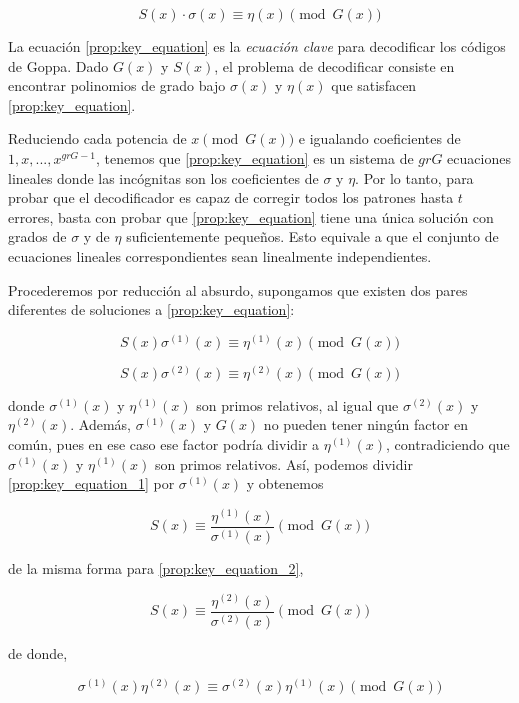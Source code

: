 \begin{equation}
    \label{prop:key_equation}
    S(x) \cdot \sigma(x) \equiv \eta(x) \pmod{G(x)}
\end{equation}

La ecuación \ref{prop:key_equation} es la \emph{ecuación clave} para decodificar los códigos de Goppa. Dado $G(x)$ y $S(x)$, el problema de decodificar consiste en encontrar polinomios de grado bajo $\sigma(x)$ y $\eta(x)$ que satisfacen \ref{prop:key_equation}.

Reduciendo cada potencia de $x \pmod{G(x)}$ e igualando coeficientes de $1, x, ..., x^{gr G - 1}$, tenemos que \ref{prop:key_equation} es un sistema de $gr G$ ecuaciones lineales donde las incógnitas son los coeficientes de $\sigma$ y $\eta$. Por lo tanto, para probar que el decodificador es capaz de corregir todos los patrones hasta $t$ errores, basta con probar que \ref{prop:key_equation} tiene una única solución con grados de $\sigma$ y de $\eta$ suficientemente pequeños. Esto equivale a que el conjunto de ecuaciones lineales correspondientes sean linealmente independientes.

Procederemos por reducción al absurdo, supongamos que existen dos pares diferentes de soluciones a \ref{prop:key_equation}:

\begin{equation}
    \label{prop:key_equation_1}
    S(x) \sigma^{(1)}(x) \equiv \eta^{(1)}(x) \pmod{G(x)}
\end{equation}

\begin{equation}
    \label{prop:key_equation_2}
    S(x) \sigma^{(2)}(x) \equiv \eta^{(2)}(x) \pmod{G(x)}
\end{equation}

donde $\sigma^{(1)}(x)$ y $\eta^{(1)}(x)$ son primos relativos, al igual que $\sigma^{(2)}(x)$ y $\eta^{(2)}(x)$. Además, $\sigma^{(1)}(x)$ y $G(x)$ no pueden tener ningún factor en común, pues en ese caso ese factor podría dividir a $\eta^{(1)}(x)$, contradiciendo que $\sigma^{(1)}(x)$ y $\eta^{(1)}(x)$ son primos relativos. Así, podemos dividir \ref{prop:key_equation_1} por $\sigma^{(1)}(x)$ y obtenemos

$$S(x) \equiv \frac{\eta^{(1)}(x)}{\sigma^{(1)}(x)} \pmod{G(x)}$$

de la misma forma para \ref{prop:key_equation_2},

$$S(x) \equiv \frac{\eta^{(2)}(x)}{\sigma^{(2)}(x)} \pmod{G(x)}$$

de donde,

$$\sigma^{(1)}(x) \eta^{(2)}(x) \equiv \sigma^{(2)}(x) \eta^{(1)}(x) \pmod{G(x)}$$